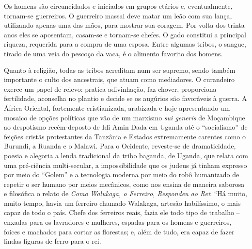 \documentclass[
  letterpaper,
  DIV=11,
  numbers=noendperiod]{scrreprt}
\begin{document}
Os homens são circuncidados e iniciados em grupos etários e,
eventualmente, tornam-se guerreiros. O guerreiro massai deve matar um
leão com sua lança, utilizando apenas uma das mãos, para mostrar sua
coragem. Por volta dos trinta anos eles se aposentam, casam-se e
tornam-se chefes. O gado constitui a principal riqueza, requerida para a
compra de uma esposa. Entre algumas tribos, o sangue, tirado de uma veia
do pescoço da vaca, é o alimento favorito dos homens.

Quanto à religião, todas as tribos acreditam num ser supremo, sendo
também importante o culto dos ancestrais, que atuam como mediadores. O
curandeiro exerce um papel de relevo: pratica adivinhação, faz chover,
proporciona fertilidade, aconselha no plantio e decide se os augúrios
são favoráveis à guerra. A África Oriental, fortemente cristianizada,
arabizada e hoje apresentando um mosaico de opções políticas que vão de
um marxismo \emph{sui generis} de Moçambique ao despotismo recém-deposto
de Idi Amin Dada em Uganda até o ``socialismo'' de feições cristãs
protestantes da Tanzânia e Estados extremamente carentes como o Burundi,
a Ruanda e o Malawi. Para o Ocidente, reveste-se de dramaticidade,
poesia e alegoria a lenda tradicional da tribo baganda, de Uganda, que
relata com uma pré-ciência multi-secular, a impossibilidade que os
judeus já tinham expresso por meio do ``Golem'' e a tecnologia moderna
por meio do robô humanizado de repetir o ser humano por meios mecânicos,
como nos ensina de maneira saborosa e filosófica o relato de \emph{Como
Walukaga, o Ferreiro, Respondeu ao Rei}: ``Há muito, muito tempo, havia
um ferreiro chamado Walakaga, artesão habilíssimo, o mais capaz de todo
o país. Chefe dos ferreiros reais, fazia ele todo tipo de trabalho --
enxadas para os lavradores e mulheres, espadas para os homens e
guerreiros, foices e machados para cortar as florestas; e, além de tudo,
era capaz de fazer lindas figuras de ferro para o rei.
\end{document}
